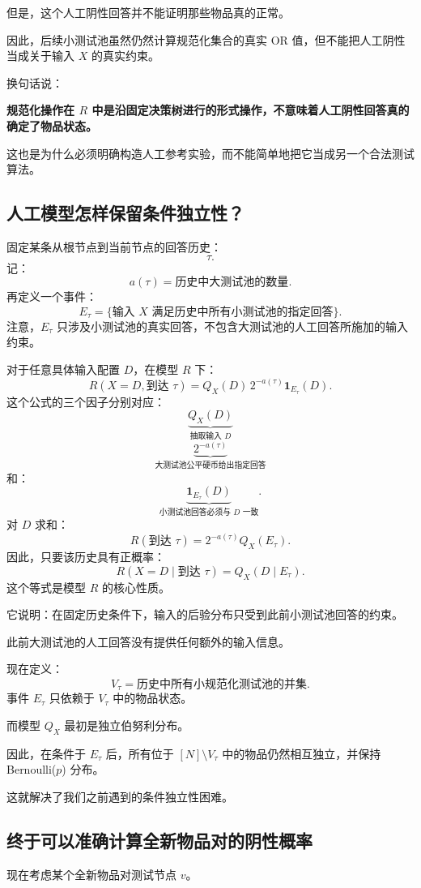 \documentclass[UTF8,11pt]{ctexart}
\begin{document}
但是，这个人工阴性回答并不能证明那些物品真的正常。

因此，后续小测试池虽然仍然计算规范化集合的真实 OR 值，但不能把人工阴性当成关于输入 $X$ 的真实约束。

换句话说：

\textbf{规范化操作在 $R$ 中是沿固定决策树进行的形式操作，不意味着人工阴性回答真的确定了物品状态。}

这也是为什么必须明确构造人工参考实验，而不能简单地把它当成另一个合法测试算法。

\subsection{人工模型怎样保留条件独立性？}
固定某条从根节点到当前节点的回答历史：
\[\tau.\]
记：
\[a(\tau)=\text{历史中大测试池的数量}.\]
再定义一个事件：
\[E_\tau=\{\text{输入 }X\text{ 满足历史中所有小测试池的指定回答}\}.\]
注意，$E_\tau$ 只涉及小测试池的真实回答，不包含大测试池的人工回答所施加的输入约束。

对于任意具体输入配置 $D$，在模型 $R$ 下：
\begin{equation}
\boxed{R(X=D,\text{到达 }\tau)=Q_X(D)\,2^{-a(\tau)}\mathbf1_{E_\tau}(D).}
\tag{28}
\end{equation}
这个公式的三个因子分别对应：
\[\underbrace{Q_X(D)}_{\text{抽取输入 }D}\]
\[\underbrace{2^{-a(\tau)}}_{\text{大测试池公平硬币给出指定回答}}\]
和：
\[\underbrace{\mathbf1_{E_\tau}(D)}_{\text{小测试池回答必须与 }D\text{ 一致}}.\]
对 $D$ 求和：
\[R(\text{到达 }\tau)=2^{-a(\tau)}Q_X(E_\tau).\]
因此，只要该历史具有正概率：
\begin{equation}\boxed{R(X=D\mid\text{到达 }\tau)=Q_X(D\mid E_\tau).}\tag{29}\end{equation}
这个等式是模型 $R$ 的核心性质。

它说明：在固定历史条件下，输入的后验分布只受到此前小测试池回答的约束。

此前大测试池的人工回答没有提供任何额外的输入信息。

现在定义：
\[V_\tau=\text{历史中所有小规范化测试池的并集}.\]
事件 $E_\tau$ 只依赖于 $V_\tau$ 中的物品状态。

而模型 $Q_X$ 最初是独立伯努利分布。

因此，在条件于 $E_\tau$ 后，所有位于 $[N]\setminus V_\tau$ 中的物品仍然相互独立，并保持 Bernoulli($p$) 分布。

这就解决了我们之前遇到的条件独立性困难。

\subsection{终于可以准确计算全新物品对的阴性概率}
现在考虑某个全新物品对测试节点 $v$。
\end{document}
